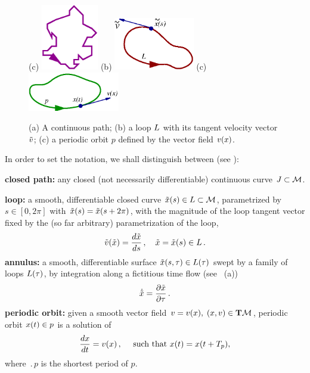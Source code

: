 %


\section{\descent}


\begin{figure}[t] %
\centering
(c) \includegraphics[width=2.5cm]{figs/path.eps}
\hspace{0.1in}
(b) \includegraphics[width=3.5cm]{figs/loop.eps}
\hspace{0.1in}
(c) \includegraphics[width=4.0cm]{figs/porbit.eps}
\caption{
 (a) A continuous path; (b) a loop $L$ with its tangent velocity vector $\tilde{v}$;
 (c) a periodic orbit $p$ defined by the vector field $v(x)$.
        }
\label{f:loops}
\end{figure}

    In order to set the notation, we shall distinguish between (see ):

\medskip
\noindent
 {\bf closed path:}
 any closed (not necessarily differentiable) continuous curve 
$J \subset {\cal M}$.

\medskip
\noindent
{\bf loop:}
 a smooth, differentiable closed curve $\tilde{x}(s)\in L \subset 
{\cal M}$, 
parametrized by $s \in [0,2\pi]$ with $\tilde{x}(s)=\tilde{x}(s+2\pi)$, with the
magnitude of the loop tangent vector fixed by 
the (so far arbitrary) parametrization of the loop,
\[
\tilde{v}(\tilde{x})=\frac{d \tilde{x}}{ds}\,, \quad \tilde{x}=\tilde{x}(s) \in L
\,.
\]   
{\bf annulus:} 
 a smooth, differentiable surface $\tilde{x}(s,\tau)\in L(\tau)$ swept by a 
family of loops $L(\tau)$, by integration along a fictitious time flow
(see ~(a))
\[
\dot{\tilde{x}}=\frac{\partial \tilde{x}}{\partial \tau}
\,.
\]
{\bf periodic orbit:}
 given a smooth vector field $v=v(x),\; (x,v) \in {\bf T} {\cal M}$, periodic orbit $x(t) \in p$ is a solution of
\[
\frac{dx}{dt}=v(x) 
	\,,\quad
	\mbox{ such that } x(t)=x(t+{T_{p}}),
\] 
where $\period{p}$ is the shortest period of $p$.



